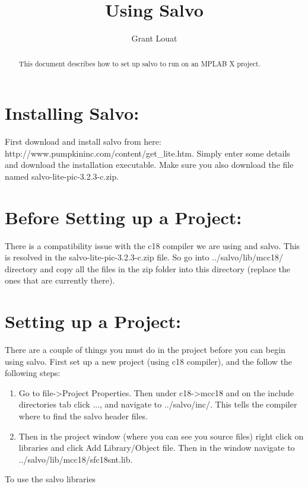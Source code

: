 \documentclass[]{article}
\title{Using Salvo}
\author{Grant Louat}
\begin{document}
\maketitle

\begin{abstract}
This document describes how to set up salvo to run on an MPLAB X project.
\end{abstract}

\section{Installing Salvo:}
First download and install salvo from here: http://www.pumpkininc.com/content/get\_lite.htm. Simply enter some details and download the installation executable. \newline
Make sure you also download the file named salvo-lite-pic-3.2.3-c.zip.

\section{Before Setting up a Project:}
There is a compatibility issue with the c18 compiler we are using and salvo. This is resolved in the salvo-lite-pic-3.2.3-c.zip file. So go into ../salvo/lib/mcc18/ directory and copy all the files in the zip folder into this directory (replace the ones that are currently there).

\section{Setting up a Project:}
There are a couple of things you must do in the project before you can begin using salvo. First set up a new project (using c18 compiler), and the follow the following steps:
\begin{enumerate}
	\item Go to file->Project Properties. Then under c18->mcc18 and on the include directories tab click ..., and navigate to ../salvo/inc/. This tells the compiler where to find the salvo header files.
	\item Then in the project window (where you can see you source files) right click on libraries and click Add Library/Object file. Then in the window navigate to ../salvo/lib/mcc18/sfc18snt.lib.
\end{enumerate}
To use the salvo libraries
\end{document}
